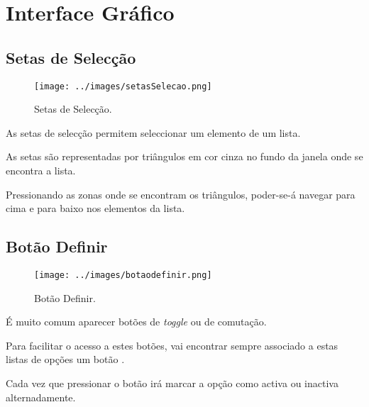 \newpage
\section{Interface Gráfico}





\subsection{Setas de Selecção}

\begin{figure}[h]
\begin{center}
\texttt{[image: ../images/setasSelecao.png]}
\caption[Submanifold]{Setas de Selecção.}
\end{center}
\end{figure}


As setas de selecção permitem seleccionar um elemento de um lista.

As setas são representadas por triângulos em cor cinza no fundo da janela onde se encontra a lista. 

Pressionando as zonas onde se encontram os triângulos, poder-se-á navegar para cima e para baixo nos elementos da lista.

\subsection{Botão Definir}

\begin{figure}[h]
\begin{center}
\texttt{[image: ../images/botaodefinir.png]}
\caption[Submanifold]{Botão Definir.}
\label{botaodefinir}
\end{center}
\end{figure}


É muito comum aparecer botões de \emph{toggle} ou de comutação. 

Para facilitar o acesso a estes botões, vai encontrar sempre associado
a estas listas de opções um botão .

Cada vez que pressionar o botão  irá marcar a opção 
como activa ou inactiva alternadamente.

